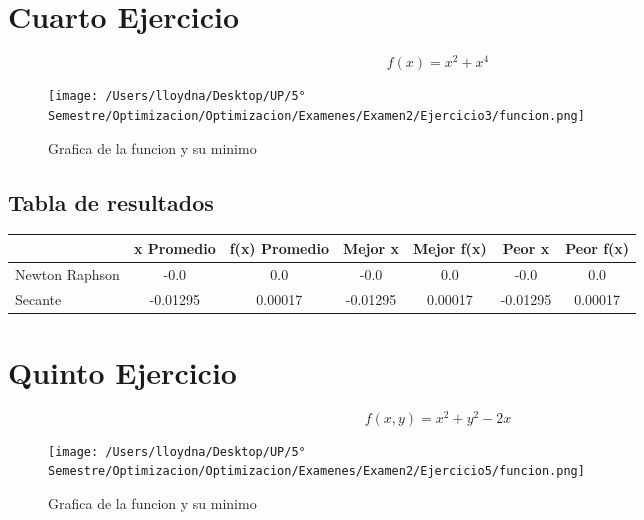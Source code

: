 \documentclass{report}
\begin{document}
        \section{Cuarto Ejercicio}
            \begin{equation*}
                f(x)=x^2+x^4
            \end{equation*}

            \begin{figure}[H]
                \texttt{[image: /Users/lloydna/Desktop/UP/5° Semestre/Optimizacion/Optimizacion/Examenes/Examen2/Ejercicio3/funcion.png]}
                \caption{Grafica de la funcion y su minimo}
                \label{fig:fun14}
            \end{figure}

            \subsection{Tabla de resultados}
                \begin{tabular}{l|c|c|c|c|c|c}
                    & x Promedio & f(x) Promedio & Mejor x & Mejor f(x) & Peor x & Peor f(x)\\
                    \hline
                    Newton Raphson & -0.0 & 0.0 & -0.0 & 0.0 & -0.0 & 0.0\\
                    \hline
                    Secante & -0.01295 & 0.00017 & -0.01295 & 0.00017 & -0.01295 & 0.00017\\
                    \hline
                \end{tabular}
        \pagebreak

        \section{Quinto Ejercicio}
            \begin{equation*}
                f(x,y)=x^2+y^2-2x
            \end{equation*}

            \begin{figure}[H]
                \texttt{[image: /Users/lloydna/Desktop/UP/5° Semestre/Optimizacion/Optimizacion/Examenes/Examen2/Ejercicio5/funcion.png]}
                \caption{Grafica de la funcion y su minimo}
                \label{fig:fun15}
            \end{figure}
\end{document}
